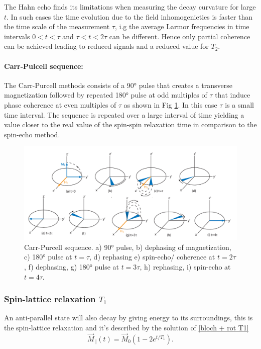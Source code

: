 The Hahn echo finds its limitations when measuring the decay curvature for large $t$. In such cases the time evolution due to the field inhomogenieties is faster than the time scale of the measurement $\tau$, i.g the average Larmor frequencies in time intervals $0 < t < \tau$ and $\tau < t < 2 \tau$ can be different. Hence only partial coherence can be achieved leading to reduced signals and a reduced value for $T_2$.

\paragraph{Carr-Pulcell sequence: }
The Carr-Purcell methods consists of a 90° pulse that creates a transverse magnetization followed by repeated 180° pulse at odd multiples of $\tau$ that induce phase coherence at even multiples of $\tau$ as shown in Fig \ref{fig: carr-purcell sequence}. In this case $\tau$ is a small time interval. 
The sequence is repeated over a large interval of time yielding a value closer to the real value of the spin-spin relaxation time in comparison to the spin-echo method.
\begin{figure}[!htbp]
 \begin{center}
  \includegraphics[width=.6\textwidth]{Latex images/carr-purcell-sequence2.jpg} 
  \caption[]{ Carr-Purcell sequence. a) 90° pulse, b) dephasing of magnetization, c) 180° pulse at $t = \tau$, d) rephasing e) spin-echo/ coherence at $t = 2\tau$, f) dephasing, g) 180° pulse at $t = 3 \tau$, h) rephasing, i) spin-echo at $t = 4\tau$.  \footnotemark}
  \label{fig: carr-purcell sequence}
 \end{center}
\end{figure}

\subsubsection{Spin-lattice relaxation $T_1$}
An anti-parallel state will also decay by giving energy to its surroundings, this is the spin-lattice relaxation and it's described by  the solution of \ref{bloch + rot T1}
\begin{equation}
\label{eq: sol. bloch T1}
\vec{M}_\parallel(t) = \vec{M}_0\left( 1 - 2e^{t/T_1}\right).
\end{equation}


